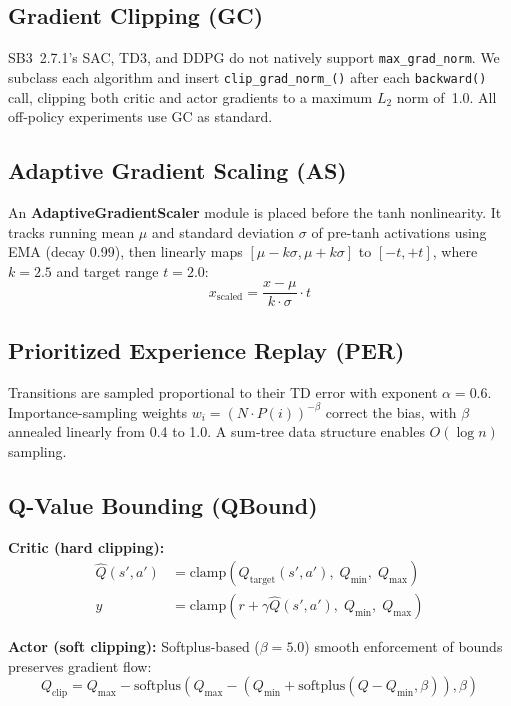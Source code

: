 \documentclass[11pt,a4paper]{article}
\begin{document}
\subsection{Gradient Clipping (GC)}

SB3~2.7.1's SAC, TD3, and DDPG do not natively support \texttt{max\_grad\_norm}. We subclass each algorithm and insert \texttt{clip\_grad\_norm\_()} after each \texttt{backward()} call, clipping both critic and actor gradients to a maximum $L_2$ norm of~1.0. All off-policy experiments use GC as standard.

\subsection{Adaptive Gradient Scaling (AS)~\citep{gebrekidan2025as}}

An \textbf{AdaptiveGradientScaler} module is placed before the tanh nonlinearity. It tracks running mean $\mu$ and standard deviation $\sigma$ of pre-tanh activations using EMA (decay 0.99), then linearly maps $[\mu - k\sigma, \mu + k\sigma]$ to $[-t, +t]$, where $k=2.5$ and target range $t=2.0$:
\begin{equation}
x_{\text{scaled}} = \frac{x - \mu}{k \cdot \sigma} \cdot t
\end{equation}

\subsection{Prioritized Experience Replay (PER)}

Transitions are sampled proportional to their TD error with exponent $\alpha=0.6$. Importance-sampling weights $w_i = (N \cdot P(i))^{-\beta}$ correct the bias, with $\beta$ annealed linearly from 0.4 to 1.0. A sum-tree data structure enables $O(\log n)$ sampling.

\subsection{Q-Value Bounding (QBound)~\citep{gebrekidan2025qbound}}

\textbf{Critic (hard clipping):}
\begin{align}
\hat{Q}(s',a') &= \text{clamp}(Q_{\text{target}}(s',a'),\; Q_{\min},\; Q_{\max}) \\
y &= \text{clamp}(r + \gamma \hat{Q}(s',a'),\; Q_{\min},\; Q_{\max})
\end{align}

\textbf{Actor (soft clipping):} Softplus-based ($\beta=5.0$) smooth enforcement of bounds preserves gradient flow:
\begin{equation}
Q_{\text{clip}} = Q_{\max} - \text{softplus}\!\left(Q_{\max} - \left(Q_{\min} + \text{softplus}(Q - Q_{\min}, \beta)\right), \beta\right)
\end{equation}
\end{document}
